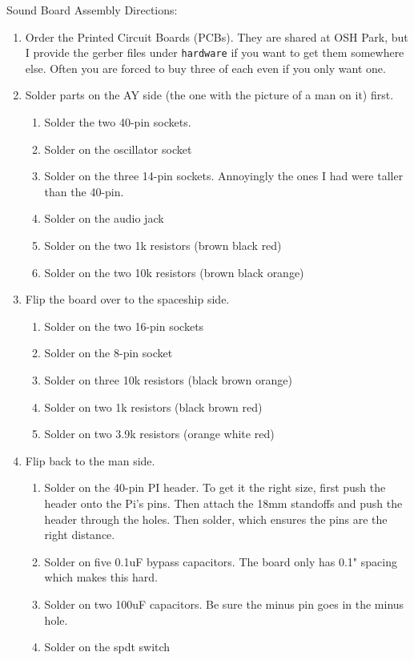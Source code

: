 \documentclass[11pt]{article}
\begin{document}
Sound Board Assembly Directions:
\begin{enumerate}
\item	Order the Printed Circuit Boards (PCBs).
	They are shared at OSH Park, but I provide the gerber files under
	{\tt hardware} if you want to get them somewhere else.
	Often you are forced to buy three of each even if you only want one.
\item	Solder parts on the AY side (the one with the picture of a man on it) first.
	\begin{enumerate}
		\item Solder the two 40-pin sockets.
		\item Solder on the oscillator socket
		\item Solder on the three 14-pin sockets.
			Annoyingly the ones I had were taller than the 40-pin.
		\item Solder on the audio jack
		\item Solder on the two 1k resistors (brown black red)
		\item Solder on the two 10k resistors (brown black orange)
	\end{enumerate}
\item	Flip the board over to the spaceship side.
	\begin{enumerate}
		\item Solder on the two 16-pin sockets
		\item Solder on the 8-pin socket
		\item Solder on three 10k resistors (black brown orange)
		\item Solder on two 1k resistors (black brown red)
		\item Solder on two 3.9k resistors (orange white red)
	\end{enumerate}
\item	Flip back to the man side.
	\begin{enumerate}
		\item Solder on the 40-pin PI header.
			To get it the right size, first push the header onto the Pi's pins.
			Then attach the 18mm standoffs and push the header through the holes.
			Then solder, which ensures the pins are the right distance.
		\item Solder on five 0.1uF bypass capacitors.
			The board only has 0.1" spacing which makes this hard.
		\item Solder on two 100uF capacitors.
			 Be sure the minus pin goes in the minus hole.
		\item	Solder on the spdt switch

\end{enumerate}
\end{enumerate}
\end{document}
